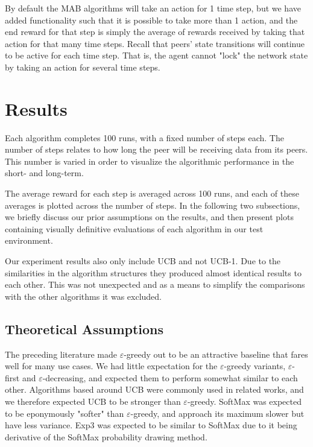 \documentclass{article}
\begin{document}
By default the MAB algorithms will take an action for 1 time step, but we have added functionality such that it is possible to take more than 1 action, and the end reward 
for that step is simply the average of rewards received by taking that action for that many time steps. Recall that peers' state transitions will continue to be active 
for each time step. That is, the agent cannot "lock" the network state by taking an action for several time steps. 

\section{Results}
Each algorithm completes 100 runs, with a fixed number of steps each. The number of steps relates to how long the peer will be receiving data from its peers. This number is 
varied in order to visualize the algorithmic performance in the short- and long-term. 

The average reward for each step is averaged across 100 runs, and each of these averages is plotted across the number of steps. In the following two subsections, we briefly 
discuss our prior assumptions on the results, and then present plots containing visually definitive evaluations of each algorithm in our test environment.

Our experiment results also only include UCB and not UCB-1. Due to the similarities in the algorithm structures they produced almost identical results to each other. 
This was not unexpected and as a means to simplify the comparisons with the other algorithms it was excluded. 

\subsection{Theoretical Assumptions} 
The preceding literature made $\varepsilon$-greedy out to be an attractive baseline that fares well for many use cases. We had little expectation for the 
$\varepsilon$-greedy variants, $\varepsilon$-first and $\varepsilon$-decreasing, and expected them to perform somewhat similar to each other. Algorithms based around UCB 
were commonly used in related works, and we therefore expected UCB to be stronger than $\varepsilon$-greedy. SoftMax was expected to be eponymously "softer" than 
$\varepsilon$-greedy, and approach its maximum slower but have less variance. Exp3 was expected to be similar to SoftMax due to it being derivative of the SoftMax 
probability drawing method.
\end{document}
